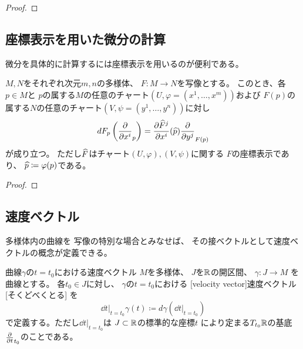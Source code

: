 \documentclass[report]{jlreq}
\begin{document}
\begin{proof}
    \TODO{}
\end{proof}

\subsection{座標表示を用いた微分の計算}

微分を具体的に計算するには座標表示を用いるのが便利である。

\begin{proposition}
    $M, N$をそれぞれ次元$m, n$の多様体、
    $F \colon M \to N$を{\smooth}写像とする。
    このとき、各$p \in M$と
    $p$の属する$M$の任意のチャート$(U, \varphi = (x^1, \dots, x^m))$および
    $F(p)$の属する$N$の任意のチャート$(V, \psi = (y^1, \dots, y^n))$に対し
    \begin{equation}
        dF_p \myparen{\deldel{x^i}_p}
            = \deldel[\what{F}^j]{x^i}(\what{p})
            \deldel{y^j}_{F(p)}
    \end{equation}
    が成り立つ。
    ただし$\widehat{F}$はチャート$(U, \varphi), (V, \psi)$に関する
    $F$の座標表示であり、
    $\widehat{p} \coloneqq \varphi(p)$である。
\end{proposition}

\begin{proof}
    \TODO{}
\end{proof}


\subsection{速度ベクトル}

多様体内の{\smooth}曲線を
{\smooth}写像の特別な場合とみなせば、
その接ベクトルとして速度ベクトルの概念が定義できる。

\begin{definition}[速度ベクトル]
        {曲線$\gamma$の$t = t_0$における速度ベクトル}
    $M$を多様体、
    $J$を$\mathbb{R}$の開区間、
    $\gamma \colon J \to M$
    を{\smooth}曲線とする。
    各$t_0 \in J$に対し、
    $\gamma$の$t = t_0$における
    [velocity vector]{速度ベクトル}[そくどべくとる]
    を
    \begin{equation}
        \dd{t}\bigg|_{t = t_0} \gamma(t)
            \coloneqq d\gamma\left(
                \dd{t}\bigg|_{t = t_0}
            \right)
    \end{equation}
    で定義する。ただし$\dd{t}\bigg|_{t = t_0}$は
    $J \subset \mathbb{R}$の標準的な座標$t$
    により定まる$T_{t_0}\mathbb{R}$の基底
    $\deldel{t}_{t_0}$のことである。
\end{definition}
\end{document}
